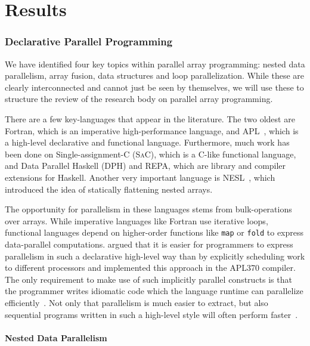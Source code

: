 \documentclass[a4paper]{article}
\newcommand{\sac}{S\textsc{a}C}
\begin{document}
\newpage{}
\part{Results}
\label{part:results}

\section{Declarative Parallel Programming}
\label{sec:declarative-parallel-programming}

We have identified four key topics within parallel array programming:
nested data parallelism, array fusion, data structures and loop
parallelization. While these are clearly interconnected and cannot
just be seen by themselves, we will use these to structure the review
of the research body on parallel array programming.

There are a few key-languages that appear in the literature. The two
oldest are Fortran, which is an imperative
high-performance language, and APL~\cite{Iverson1962Programming},
which is a high-level declarative and functional
language. Furthermore, much work has been done on Single-assignment-C
(\sac{}), which is a C-like functional language, and Data
Parallel Haskell (DPH) and REPA, which are library and
compiler extensions for Haskell. Another very important language is
NESL~\cite{Blelloch1993NESL}, which introduced the idea of statically
flattening nested arrays.

The opportunity for parallelism in these languages stems from
bulk-operations over arrays. While imperative languages like Fortran
use iterative loops, functional languages depend on higher-order
functions like \texttt{map} or \texttt{fold} to express data-parallel
computations. \citet{Ching:1990:APA:97808.97826} argued that it is
easier for programmers to express parallelism in such a declarative
high-level way than by explicitly scheduling work to different
processors and implemented this approach in the APL370 compiler. The
only requirement to make use of such implicitly parallel constructs is
that the programmer writes idiomatic code which the language runtime
can parallelize
efficiently~\cite{Bernecky:2015:AEP:2774959.2774962}. Not only that
parallelism is much easier to extract, but also sequential programs
written in such a high-level style will often perform
faster~\cite{Bernecky:2015:AEP:2774959.2774962}.

\subsection{Nested Data Parallelism}
\label{sec:nest-data-parall}
\end{document}
